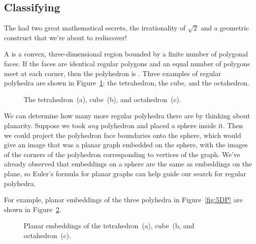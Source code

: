 \subsection{Classifying }

The  had two great mathematical secrets, the
irrationality of $\sqrt{2}$ and a geometric construct that we're about
to rediscover!

A  is a convex, three-dimensional region bounded by a
finite number of polygonal faces.  If the faces are identical regular
polygons and an equal number of polygons meet at each corner, then the
polyhedron is .  Three
examples of regular polyhedra are shown in Figure~\ref{fig:polyhedra}: the
tetrahedron, the cube, and the octahedron.

\begin{figure}\redrawn

\quad
{}
\quad
{}

\caption{The tetrahedron~(a), cube~(b), and octahedron~(c).}

\label{fig:polyhedra}
\end{figure}

We can determine how many more regular polyhedra there are by thinking
about planarity.  Suppose we took \emph{any} polyhedron and placed a
sphere inside it.  Then we could project the polyhedron face
boundaries onto the sphere, which would give an image that was a
planar graph embedded on the sphere, with the images of the corners of
the polyhedron corresponding to vertices of the graph.  We've already
observed that embeddings on a sphere are the same as embeddings on the
plane, so Euler's formula for planar graphs can help guide our search
for regular polyhedra.

For example, planar embeddings of the three polyhedra in
Figure~\ref{fig:5DP} are shown in Figure~\ref{fig:5DQ}.

\begin{figure}\redrawn


\quad
{}
\quad
{}

\caption{Planar embeddings of the tetrahedron~(a), cube~(b, and
  octahedron~(c).}

\label{fig:5DQ}

\end{figure}

